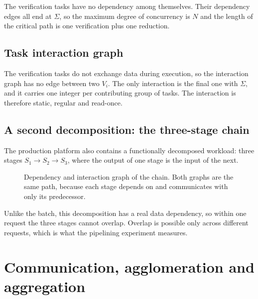 \documentclass[11pt,a4paper]{article}
\begin{document}
The verification tasks have no dependency among themselves. Their dependency edges all end at $\Sigma$, so the maximum degree of concurrency is $N$ and the length of the critical path is one verification plus one reduction.

\subsection{Task interaction graph}

The verification tasks do not exchange data during execution, so the interaction graph has no edge between two $V_i$. The only interaction is the final one with $\Sigma$, and it carries one integer per contributing group of tasks. The interaction is therefore static, regular and read-once.

\subsection{A second decomposition: the three-stage chain}

The production platform also contains a functionally decomposed workload: three stages $S_1\to S_2\to S_3$, where the output of one stage is the input of the next.

\begin{figure}[H]
\centering
{}
\caption{Dependency and interaction graph of the chain. Both graphs are the same path, because each stage depends on and communicates with only its predecessor.}
\end{figure}

Unlike the batch, this decomposition has a real data dependency, so within one request the three stages cannot overlap. Overlap is possible only across different requests, which is what the pipelining experiment measures.

\section{Communication, agglomeration and aggregation}
\end{document}

